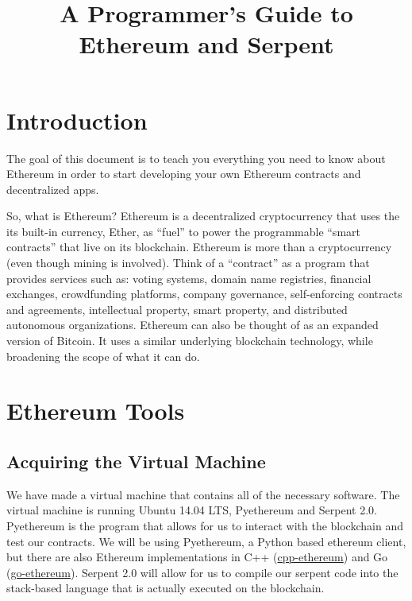 \documentclass[12pt]{article}
\begin{document}
\title{A Programmer's Guide to Ethereum and Serpent}


\maketitle

\setcounter{tocdepth}{5}
\tableofcontents

\section{Introduction}
The goal of this document is to teach you everything you need to know about Ethereum in order to start developing your own Ethereum contracts and decentralized apps.

So, what is Ethereum? Ethereum is a decentralized cryptocurrency that uses the its built-in currency, Ether, as ``fuel'' to power the programmable ``smart contracts'' that live on its blockchain. Ethereum is more than a cryptocurrency (even though mining is involved). Think of a ``contract'' as a program that provides services such as: voting systems, domain name registries, financial exchanges, crowdfunding platforms, company governance, self-enforcing contracts and agreements, intellectual property, smart property, and distributed autonomous organizations. Ethereum can also be thought of as an expanded version of Bitcoin. It uses a similar underlying blockchain technology, while broadening the scope of what it can do. \cite{EthereumWhitePaper}
\section{Ethereum Tools}
\subsection{Acquiring the Virtual Machine}
We have made a virtual machine that contains all of the necessary software. The virtual machine is running Ubuntu 14.04 LTS, Pyethereum and Serpent 2.0. Pyethereum is the program that allows for us to interact with the blockchain and test our contracts. We will be using Pyethereum, a Python based ethereum client, but there are also Ethereum implementations in C++ (\href{https://github.com/ethereum/cpp-ethereum}{cpp-ethereum}) and Go (\href{https://github.com/ethereum/go-ethereum}{go-ethereum}). Serpent 2.0 will allow for us to compile our serpent code into the stack-based language that is actually executed on the blockchain. 
\end{document}
